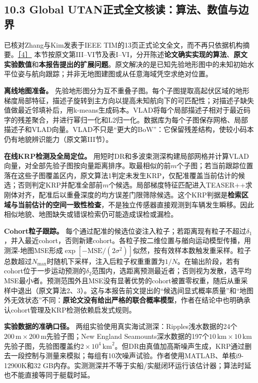 \hypertarget{global-utanux6b63ux5f0fux5168ux6587ux6838ux8bfbux7b97ux6cd5ux6570ux503cux4e0eux8fb9ux754c}{%
\subsection{10.3 Global UTAN正式全文核读：算法、数值与边界}\label{global-utanux6b63ux5f0fux5168ux6587ux6838ux8bfbux7b97ux6cd5ux6570ux503cux4e0eux8fb9ux754c}}

已核对Zhang与Kim发表于IEEE TIM的13页正式论文全文，而不再只依据机构摘要。\href{https://doi.org/10.1109/TIM.2026.3716492}{［4］} 本节按原文第III--VI节及表I--VI，分开陈述\textbf{论文确实实现的算法}、\textbf{原文实验数值}和\textbf{本报告提出的扩展问题}。原文解决的是已知先验地形图中的未知初始水平位姿与航向跟踪；并非无地图建图或从任意海域凭空求绝对位置。

\textbf{离线地图准备。} 先验地形图分为互不重叠子图。每个子图提取高起伏区域的地形梯度局部特征，描述子旋转到主方向以提高未知航向下的可匹配性；对描述子缺失值做最近邻填补后，用k-means生成码本。VLAD将每个局部描述子相对于最近码字的残差聚合，并进行幂归一化和L2归一化。数据库为每个子图保存网格、局部描述子和VLAD向量。VLAD不只是``更大的BoW''：它保留残差结构，使较小码本仍有地貌辨识能力（原文第III节）。

\textbf{在线KRP检测及全局定位。} 用短时DR和多波束测深构建局部网格并计算VLAD向量，对全部先验子图按向量距离排序。取最相似的前\(m\)个子图；若当前跟踪位置落在这些子图覆盖区内，原文算法1判定未发生KRP，仅配准覆盖当前估计的候选；否则判定KRP并配准全部前\(m\)个候选。局部梯度特征匹配进入TEASER++求刚体对齐，配准后以重叠深度的均方误差门限筛除候选。这个KRP判据是\textbf{检索区域与当前估计的空间一致性检查}，不是独立传感器直接观测到车辆发生瞬移。因此相似地貌、地图缺失或错误检索仍可能造成误检或漏检。

\textbf{Cohort粒子跟踪。} 每个通过配准的候选位姿注入粒子；若距离现有粒子不超过\(\delta_1\)，并入最近cohort，否则新建cohort。各粒子按二维位置与艏向运动模型传播，用测深-地图MSE形成\(\exp[-\mathrm{MSE}/(2\sigma^2)]\)似然，按有效样本数触发重采样。粒子总数超过\(N_{\max}\)时随机下采样，注入后粒子权重重置为\(1/N\)。在输出阶段，若有cohort位于一步运动预测的\(\delta_2\)范围内，选距离预测最近者；否则视为发散，选平均MSE最小者。预测范围外且MSE没有显著优势的cohort被置零权重，随后从重采样中退出（原文算法2、3）。这与本报告前文提出的``候选间显式概率质量''和``地图外无效状态''不同：\textbf{原论文没有给出严格的联合概率模型}，作者在结论中也明确承认cohort管理及KRP检测依赖启发式规则。

\textbf{实验数据的准确口径。} 两组实验使用真实海试测深：Ripples浅水数据的24个\(200\,\mathrm m\times200\,\mathrm m\)先验子图；New England Seamounts深水数据的197个\(10\,\mathrm{km}\times10\,\mathrm{km}\)先验子图，先验图覆盖约\(2\times10^4\,\mathrm{km}^2\)。但DR由真值加高斯噪声生成，KRP通过删去一段控制与测量来模拟；每组有10次噪声试验。作者使用MATLAB、单核i9-12900K和32 GB内存。实测测深并不等于实船/实艇闭环运行该估计器；算法时延也不能直接等同于艇载时延。

